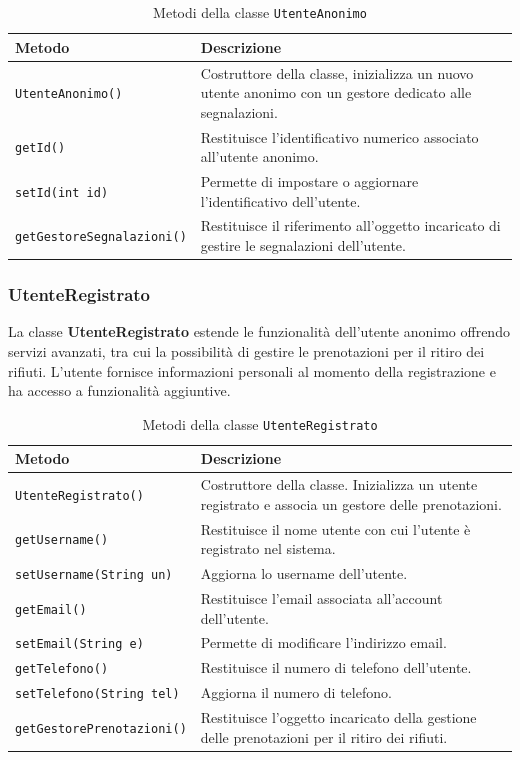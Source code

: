 \begin{table}[H]
\centering
\begin{tabularx}{\textwidth}{|l|X|}
\hline
\textbf{Metodo} & \textbf{Descrizione} \\
\hline
\texttt{UtenteAnonimo()} & Costruttore della classe, inizializza un nuovo utente anonimo con un gestore dedicato alle segnalazioni. \\
\hline
\texttt{getId()} & Restituisce l’identificativo numerico associato all’utente anonimo. \\
\hline
\texttt{setId(int id)} & Permette di impostare o aggiornare l’identificativo dell’utente. \\
\hline
\texttt{getGestoreSegnalazioni()} & Restituisce il riferimento all’oggetto incaricato di gestire le segnalazioni dell’utente. \\
\hline
\end{tabularx}
\caption{Metodi della classe \texttt{UtenteAnonimo}}
\end{table}

\subsubsection{UtenteRegistrato}

La classe \textbf{UtenteRegistrato} estende le funzionalità dell’utente anonimo offrendo servizi avanzati, tra cui la possibilità di gestire le prenotazioni per il ritiro dei rifiuti. L’utente fornisce informazioni personali al momento della registrazione e ha accesso a funzionalità aggiuntive.

\begin{table}[H]
\centering
\begin{tabularx}{\textwidth}{|l|X|}
\hline
\textbf{Metodo} & \textbf{Descrizione} \\
\hline
\texttt{UtenteRegistrato()} & Costruttore della classe. Inizializza un utente registrato e associa un gestore delle prenotazioni. \\
\hline
\texttt{getUsername()} & Restituisce il nome utente con cui l’utente è registrato nel sistema. \\
\hline
\texttt{setUsername(String un)} & Aggiorna lo username dell’utente. \\
\hline
\texttt{getEmail()} & Restituisce l’email associata all’account dell’utente. \\
\hline
\texttt{setEmail(String e)} & Permette di modificare l’indirizzo email. \\
\hline
\texttt{getTelefono()} & Restituisce il numero di telefono dell’utente. \\
\hline
\texttt{setTelefono(String tel)} & Aggiorna il numero di telefono. \\
\hline
\texttt{getGestorePrenotazioni()} & Restituisce l’oggetto incaricato della gestione delle prenotazioni per il ritiro dei rifiuti. \\
\hline
\end{tabularx}
\caption{Metodi della classe \texttt{UtenteRegistrato}}
\end{table}

